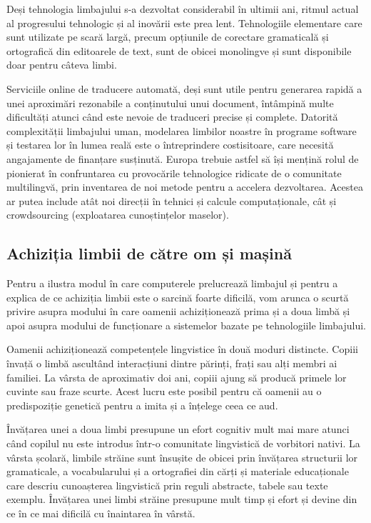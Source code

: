 \begin{multicols}{2}
Deși tehnologia limbajului s-a dezvoltat considerabil în ultimii ani, ritmul actual al progresului tehnologic și al inovării este prea lent. Tehnologiile elementare care sunt utilizate pe scară largă, precum opțiunile de corectare gramaticală și ortografică din editoarele de text, sunt de obicei monolingve și sunt disponibile doar pentru câteva limbi. 


Serviciile online de traducere automată, deși sunt utile pentru generarea rapidă a unei aproximări rezonabile a conținutului unui document, întâmpină multe dificultăți atunci când este nevoie de traduceri precise și complete. Datorită complexității limbajului uman, modelarea limbilor noastre în programe software și testarea lor în lumea reală este o întreprindere costisitoare, care necesită angajamente de finanțare susținută. Europa trebuie astfel să își mențină rolul de pionierat în confruntarea cu provocările tehnologice ridicate de o comunitate multilingvă, prin inventarea de noi metode pentru a accelera dezvoltarea. Acestea ar putea include atât noi direcții în tehnici și calcule computaționale, cât și crowdsourcing (exploatarea cunoștințelor maselor).

\subsection{Achiziția limbii de către om și mașină}

Pentru a ilustra modul în care computerele prelucrează limbajul și pentru a explica de ce achiziția limbii este o sarcină foarte dificilă, vom arunca o scurtă privire asupra modului în care oamenii achiziționează prima și a doua limbă și apoi asupra modului de funcționare a sistemelor bazate pe tehnologiile limbajului.


Oamenii achiziționează competențele lingvistice în două moduri distincte. Copiii învață o limbă ascultând interacțiuni dintre părinți, frați sau alți membri ai familiei. La vârsta de aproximativ doi ani, copiii ajung să producă primele lor cuvinte sau fraze scurte. Acest lucru este posibil pentru că oamenii au o predispoziție genetică pentru a imita și a înțelege ceea ce aud.

Învățarea unei a doua limbi presupune un efort cognitiv mult mai mare atunci când copilul nu este introdus \mbox{într-o} comunitate lingvistică de vorbitori nativi. La vârsta școlară, limbile străine sunt însușite de obicei prin învățarea structurii lor gramaticale, a vocabularului și a ortografiei din cărți și materiale educaționale care descriu cunoașterea lingvistică prin reguli abstracte, tabele sau texte exemplu. Învățarea unei limbi străine presupune mult timp și efort și devine din ce în ce mai dificilă cu înaintarea în vârstă.


\end{multicols}
